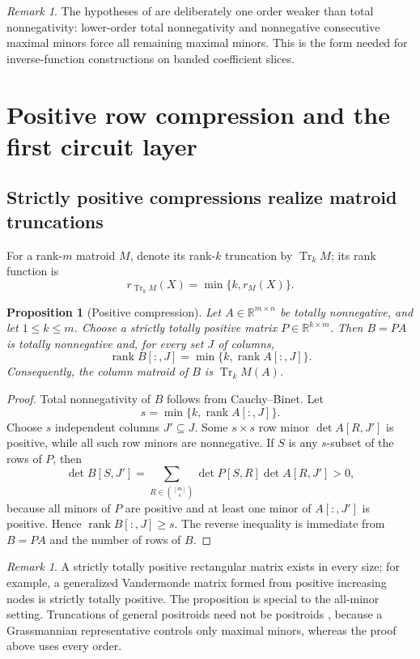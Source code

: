 \documentclass[11pt]{amsart}
\newtheorem{proposition}[theorem]{Proposition}
\theoremstyle{definition}
\theoremstyle{remark}
\newtheorem{remark}[theorem]{Remark}
\newcommand{\R}{\mathbb R}
\newcommand{\rank}{\operatorname{rank}}
\newcommand{\Tr}{\operatorname{Tr}}
\begin{document}
\begin{remark}\label{rem:weaker-than-tn}
The hypotheses of  are deliberately one order weaker than total nonnegativity: lower-order total nonnegativity and nonnegative consecutive maximal minors force all remaining maximal minors.  This is the form needed for inverse-function constructions on banded coefficient slices.
\end{remark}

\section{Positive row compression and the first circuit layer}\label{sec:compression}

\subsection{Strictly positive compressions realize matroid truncations}

For a rank-$m$ matroid $M$, denote its rank-$k$ truncation by $\Tr_kM$; its rank function is
\[
 r_{\Tr_kM}(X)=\min\{k,r_M(X)\}.
\]

\begin{proposition}[Positive compression]\label{prop:positive-compression}
Let $A\in\R^{m\times n}$ be totally nonnegative, and let $1\le k\le m$.  Choose a strictly totally positive matrix $P\in\R^{k\times m}$.  Then $B=PA$ is totally nonnegative and, for every set $J$ of columns,
\begin{equation}\label{eq:rank-compression}
 \rank B[:,J]=\min\{k,\rank A[:,J]\}.
\end{equation}
Consequently, the column matroid of $B$ is $\Tr_kM(A)$.
\end{proposition}

\begin{proof}
Total nonnegativity of $B$ follows from Cauchy--Binet.  Let
\[
 s=\min\{k,\rank A[:,J]\}.
\]
Choose $s$ independent columns $J'\subseteq J$.  Some $s\times s$ row minor $\det A[R,J']$ is positive, while all such row minors are nonnegative.  If $S$ is any $s$-subset of the rows of $P$, then
\[
 \det B[S,J']
 =\sum_{R\in\binom{[m]}s}\det P[S,R]\det A[R,J']>0,
\]
because all minors of $P$ are positive and at least one minor of $A[:,J']$ is positive.  Hence $\rank B[:,J]\ge s$.  The reverse inequality is immediate from $B=PA$ and the number of rows of $B$.
\end{proof}

\begin{remark}
A strictly totally positive rectangular matrix exists in every size; for example, a generalized Vandermonde matrix formed from positive increasing nodes is strictly totally positive.  The proposition is special to the all-minor setting.  Truncations of general positroids need not be positroids \cite{Bonin}, because a Grassmannian representative controls only maximal minors, whereas the proof above uses every order.
\end{remark}
\end{document}
